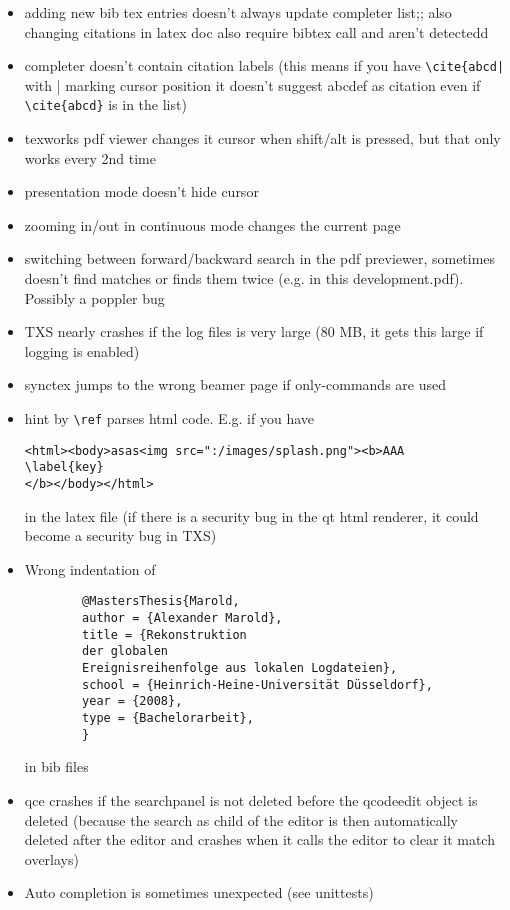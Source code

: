 \documentclass[10pt,a4paper,landscape]{report}
\begin{document}
\begin{itemize}
\item adding new bib tex entries doesn't always update completer list;; also changing citations in latex doc also require bibtex call and aren't detectedd
\item completer doesn't contain citation labels (this means if you have \verb+\cite{abcd|+ with | marking cursor position it doesn't suggest abcdef as citation even if \verb+\cite{abcd}+ is in the list)
\item texworks pdf viewer changes it cursor when shift/alt is pressed, but that only works every 2nd time
\item presentation mode doesn't hide cursor
\item zooming in/out in continuous mode changes the current page
\item switching between forward/backward search in the pdf previewer, sometimes doesn't find matches or finds them twice (e.g. in this development.pdf). Possibly a poppler bug
\item TXS nearly crashes if the log files is very large (80 MB, it gets this large if logging is enabled)
\item synctex jumps to the wrong beamer page if only-commands are used
\item hint by \verb+\ref+ parses html code. E.g. if you have \begin{verbatim}
<html><body>asas<img src=":/images/splash.png"><b>AAA
\label{key}
</b></body></html>
\end{verbatim} in the latex file (if there is a security bug in the qt html renderer, it could become a security bug in TXS)
	\item Wrong indentation of \begin{verbatim}
		@MastersThesis{Marold,
		author = {Alexander Marold},
		title = {Rekonstruktion 
		der globalen 
		Ereignisreihenfolge aus lokalen Logdateien},
		school = {Heinrich-Heine-Universität Düsseldorf},
		year = {2008},
		type = {Bachelorarbeit},
		}
	\end{verbatim} in bib files
	\item  qce crashes if the searchpanel is not deleted before the qcodeedit object is deleted (because the search as child of the editor is then automatically deleted after the editor and crashes when it calls the editor to clear it match overlays)
	\item  Auto completion is sometimes unexpected (see unittests)
\end{itemize} 
\end{document}
